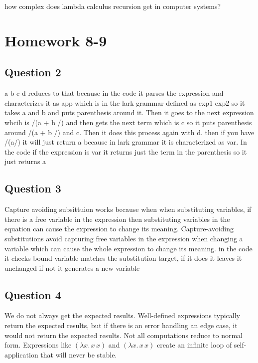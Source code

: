\documentclass{article}
\theoremstyle{plain}
\theoremstyle{definition}
\theoremstyle{remark}
\begin{document}
how complex does lambda calculus recursion get in computer systems?


\section{Homework 8-9}\label{homework89}

\subsection{Question 2}

  a b c d reduces to that because in the code it parses the expression and characterizes it as app which is in the lark grammar defined as exp1 exp2 so it takes a and b and puts parenthesis around it. Then it goes to the next expression whcih is /(a + b /) and then gets the next term which is c so it puts parenthesis around /(a + b /) and c. Then it does this process again with d. then if you have /(a/) it will just return a because in lark grammar it is characterized as var. In the code if the expression is var it returns just the term in the parenthesis so it just returns a

\subsection{Question 3}

Capture avoiding subsittuion works because when when substituting variables, if there is a free variable in the expression then substituting variables in the equation can cause the expression to change its meaning. Capture-avoiding substitutions avoid capturing free variables in the expression when changing a variable which can cause the whole expression to change its meaning. in the code it checks bound variable matches the substitution target, if it does it leaves it unchanged if not it generates a new variable

\subsection{Question 4}

We do not always get the expected results. Well-defined expressions typically return the expected results, but if there is an error handling an edge case, it would not return the expected results. Not all computations reduce to normal form. Expressions like \((\lambda x. \, x \, x)\) and \((\lambda x. \, x \, x)\) create an infinite loop of self-application that will never be stable.
\end{document}
